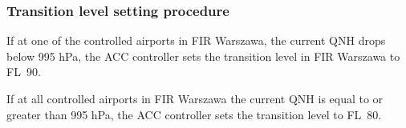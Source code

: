 \subsubsection{Transition level setting procedure}

If at one of the controlled airports in FIR Warszawa, the current QNH drops
below 995 hPa, the ACC controller sets the transition level in FIR Warszawa to
FL~90.

If at all controlled airports in FIR Warszawa the current QNH is equal to or
greater than 995 hPa, the ACC controller sets the transition level to FL~80.

